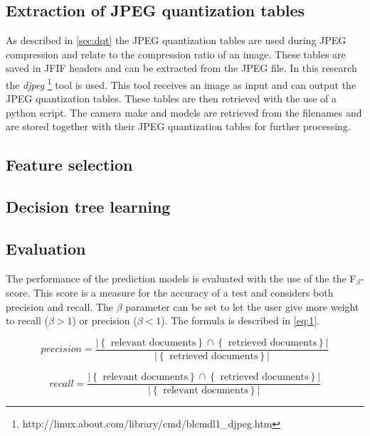 \subsection{Extraction of JPEG quantization tables}
As described in \autoref{sec:dqt} the JPEG quantization tables are used during JPEG compression and relate to the compression ratio of an image. These tables are saved in JFIF headers and can be extracted from the JPEG file. In this research the \textit{djpeg} \footnote{http://linux.about.com/library/cmd/blcmdl1\_djpeg.htm} tool is used. This tool receives an image as input and can output the JPEG quantization tables. These tables are then retrieved with the use of a python script. The camera make and models are retrieved from the filenames and are stored together with their JPEG quantization tables for further processing.

\subsection{Feature selection}

\subsection{Decision tree learning}

\subsection{Evaluation}\label{sec:eval}
The performance of the prediction models is evaluated with the use of the the F$_\beta$-score. This score is a measure for the accuracy of a test and considers both precision and recall. The $\beta$ parameter can be set to let the user give more weight to recall ($\beta > 1 $) or precision ($\beta < 1 $). The formula is described in \autoref{eq:1}.

\begin{equation}\label{eq:1}
precision =  \frac{ \left\vert{\left\{ \text{ relevant documents} \right\} \cap \left\{ \text{ retrieved documents} \right\}}\right\vert }{ \left\vert{\left\{ \text{ retrieved documents} \right\}}\right\vert}
\end{equation}

\begin{equation}\label{eq:1}
recall = \frac{ \left\vert{\left\{ \text{ relevant documents} \right\} \cap \left\{ \text{ retrieved documents} \right\}}\right\vert }{ \left\vert{\left\{ \text{ relevant documents} \right\}}\right\vert}
\end{equation}


